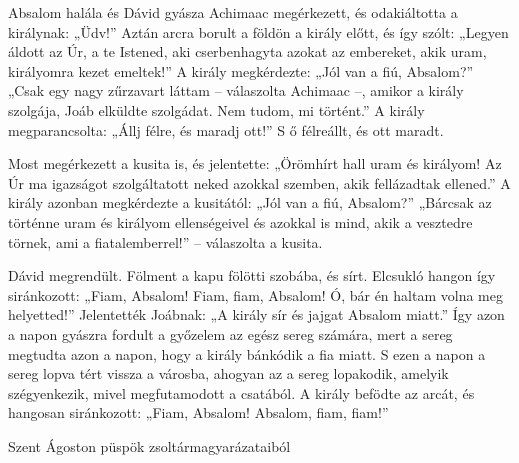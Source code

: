 \documentclass[twoside]{article}
\begin{document}
\begin{lectio}{Absalom halála és Dávid gyásza}
Achimaac megérkezett, és odakiáltotta a királynak: „Üdv!” Aztán arcra borult a földön a király előtt, és így szólt: „Legyen áldott az Úr, a te Istened, aki cserbenhagyta azokat az embereket, akik uram, királyomra kezet emeltek!” A király megkérdezte: „Jól van a fiú, Absalom?” „Csak egy nagy zűrzavart láttam – válaszolta Achimaac –, amikor a király szolgája, Joáb elküldte szolgádat. Nem tudom, mi történt.” A király megparancsolta: „Állj félre, és maradj ott!” S ő félreállt, és ott maradt.

Most megérkezett a kusita is, és jelentette: „Örömhírt hall uram és királyom! Az Úr ma igazságot szolgáltatott neked azokkal szemben, akik fellázadtak ellened.” A király azonban megkérdezte a kusitától: „Jól van a fiú, Absalom?” „Bárcsak az történne uram és királyom ellenségeivel és azokkal is mind, akik a vesztedre törnek, ami a fiatalemberrel!” – válaszolta a kusita.

Dávid megrendült. Fölment a kapu fölötti szobába, és sírt. Elcsukló hangon így siránkozott: „Fiam, Absalom! Fiam, fiam, Absalom! Ó, bár én haltam volna meg helyetted!” Jelentették Joábnak: „A király sír és jajgat Absalom miatt.” Így azon a napon gyászra fordult a győzelem az egész sereg számára, mert a sereg megtudta azon a napon, hogy a király bánkódik a fia miatt. S ezen a napon a sereg lopva tért vissza a városba, ahogyan az a sereg lopakodik, amelyik szégyenkezik, mivel megfutamodott a csatából. A király befödte az arcát, és hangosan siránkozott: „Fiam, Absalom! Absalom, fiam, fiam!”
\end{lectio}



Szent Ágoston püspök zsoltármagyarázataiból

{\centering{}}
\end{document}
